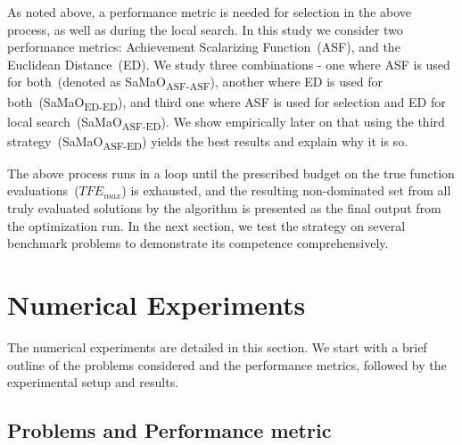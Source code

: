 As noted above, a performance metric is needed for selection in the above process, as well as during the local search. In this study we consider two performance metrics: Achievement Scalarizing Function~(ASF), and the Euclidean Distance~(ED). We study three combinations - one where ASF is used for both~(denoted as SaMaO\textsubscript{ASF-ASF}), another where ED is used for both~(SaMaO\textsubscript{ED-ED}), and third one where ASF is used for selection and ED for local search~(SaMaO\textsubscript{ASF-ED}). We show empirically later on that using the third strategy~(SaMaO\textsubscript{ASF-ED}) yields the best results and explain why it is so.

The above process runs in a loop until the prescribed budget on the true function evaluations~($TFE_{max}$) is exhausted, and the resulting non-dominated set from all truly evaluated solutions by the algorithm is presented as the final output from the optimization run. In the next section, we test the strategy on several benchmark problems to demonstrate its competence comprehensively. 

\section{Numerical Experiments}
\label{sec:KHTsec:4}

The numerical experiments are detailed in this section. We start with a brief outline of the problems considered and the performance metrics, followed by the experimental setup and results. 

\subsection{Problems and Performance metric}

